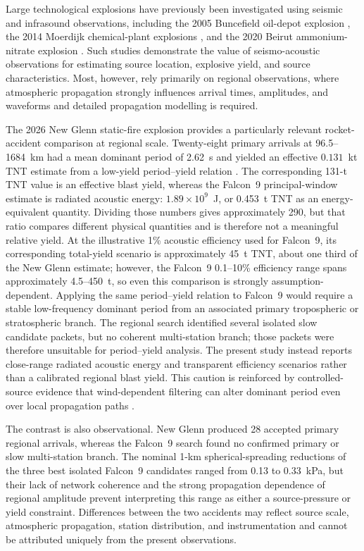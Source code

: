 \documentclass[]{seismica}
\begin{document}
Large technological explosions have previously been investigated using
seismic and infrasound observations, including the 2005 Buncefield oil-depot
explosion \citep{ottemoller_2008,green_2008,ceranna_2009}, the 2014 Moerdijk
chemical-plant explosions \citep{smink_2019}, and the 2020 Beirut
ammonium-nitrate explosion
\citep{pilger_beirut_2021,kim_pasyanos_2022}. Such studies demonstrate the value of seismo-acoustic observations for estimating source location, explosive yield, and source characteristics. Most, however, rely primarily on regional observations, where atmospheric propagation strongly influences arrival times, amplitudes, and waveforms and detailed propagation modelling is required.

The 2026 New Glenn static-fire explosion provides a particularly relevant
rocket-accident comparison at regional scale. Twenty-eight primary arrivals at
96.5--1684~km had a mean dominant period of 2.62~s and yielded an effective
$0.131$~kt TNT estimate from a low-yield period--yield relation
\citep{silber_scamfer_newglenn_2026}. The corresponding 131-t TNT value is an
effective blast yield, whereas the Falcon~9 principal-window estimate is
radiated acoustic energy: $1.89\times10^9$~J, or 0.453~t TNT as an
energy-equivalent quantity. Dividing those numbers gives approximately 290,
but that ratio compares different physical quantities and is therefore not a
meaningful relative yield. At the illustrative 1\% acoustic efficiency used
for Falcon~9, its corresponding total-yield scenario is approximately 45~t
TNT, about one third of the New Glenn estimate; however, the Falcon~9
0.1--10\% efficiency range spans approximately 4.5--450~t, so even this
comparison is strongly assumption-dependent. Applying the same period--yield
relation to Falcon~9 would require a stable low-frequency dominant period from
an associated primary tropospheric or stratospheric branch. The regional search
identified several isolated slow candidate packets, but no coherent
multi-station branch; those packets were therefore unsuitable for
period--yield analysis. The present study instead reports close-range radiated
acoustic energy and transparent efficiency scenarios rather than a calibrated
regional blast yield. This caution is
reinforced by controlled-source evidence that wind-dependent filtering can
alter dominant period even over local propagation paths
\citep{silber_wind_filtering_2026}.

The contrast is also observational. New Glenn produced 28 accepted primary
regional arrivals, whereas the Falcon~9 search found no confirmed primary or
slow multi-station branch. The nominal 1-km spherical-spreading reductions of
the three best isolated Falcon~9 candidates ranged from 0.13 to 0.33~kPa, but
their lack of network coherence and the strong propagation dependence of
regional amplitude prevent interpreting this range as either a source-pressure
or yield constraint. Differences between the two accidents may reflect source
scale, atmospheric propagation, station distribution, and instrumentation and
cannot be attributed uniquely from the present observations.
\end{document}
